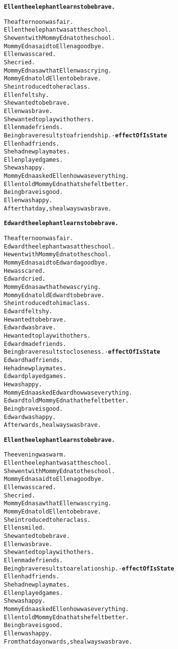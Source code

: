 \begin{alltt}
\textbf{Ellen the elephant learns to be brave.}

The afternoon was fair.
Ellen the elephant was at the school.
She went with Mommy Edna to the school.
Mommy Edna said to Ellen a goodbye.
Ellen was scared.
She cried.
Mommy Edna saw that Ellen was crying.
Mommy Edna told Ellen to be brave.
She introduced to her a class.
Ellen felt shy.
She wanted to be brave.
Ellen was brave.
She wanted to play with others.
Ellen made friends.
Being brave results to a friendship. - \textbf{effectOfIsState}
Ellen had friends.
She had new playmates.
Ellen played games.
She was happy.
Mommy Edna asked Ellen how was everything.
Ellen told Mommy Edna that she felt better.
Being brave is good.
Ellen was happy.
After that day, she always was brave.

\textbf{Edward the elephant learns to be brave.}

The afternoon was fair.
Edward the elephant was at the school.
He went with Mommy Edna to the school.
Mommy Edna said to Edward a goodbye.
He was scared.
Edward cried.
Mommy Edna saw that he was crying.
Mommy Edna told Edward to be brave.
She introduced to him a class.
Edward felt shy.
He wanted to be brave.
Edward was brave.
He wanted to play with others.
Edward made friends.
Being brave results to closeness. - \textbf{effectOfIsState}
Edward had friends.
He had new playmates.
Edward played games.
He was happy.
Mommy Edna asked Edward how was everything.
Edward told Mommy Edna that he felt better.
Being brave is good.
Edward was happy.
Afterwards, he always was brave.

\textbf{Ellen the elephant learns to be brave.}

The evening was warm.
Ellen the elephant was at the school.
She went with Mommy Edna to the school.
Mommy Edna said to Ellen a goodbye.
Ellen was scared.
She cried.
Mommy Edna saw that Ellen was crying.
Mommy Edna told Ellen to be brave.
She introduced to her a class.
Ellen smiled.
She wanted to be brave.
Ellen was brave.
She wanted to play with others.
Ellen made friends.
Being brave results to a relationship. - \textbf{effectOfIsState}
Ellen had friends.
She had new playmates.
Ellen played games.
She was happy.
Mommy Edna asked Ellen how was everything.
Ellen told Mommy Edna that she felt better.
Being brave is good.
Ellen was happy.
From that day onwards, she always was brave.
\end{alltt}

